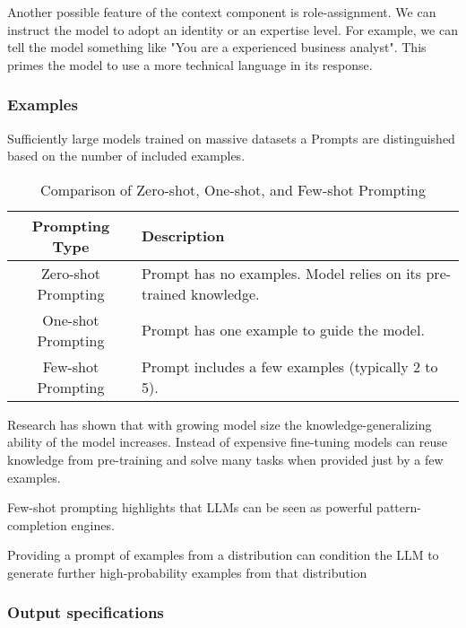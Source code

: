 Another possible feature of the context component is role-assignment. 
We can instruct the model to adopt an identity or an expertise level.
For example, we can tell the model something like "You are a experienced business analyst".
This primes the model to use a more technical language in its response.

\subsubsection{Examples}
Sufficiently large models trained on massive datasets a
Prompts are distinguished based on the number of included examples.

\begin{table}[ht!]
    \centering
    \begin{tabular}{|c|p{8cm}|}
    \hline
    \textbf{Prompting Type} & \textbf{Description} \\
    \hline
    Zero-shot Prompting & Prompt has no examples. Model relies on its pre-trained knowledge. \\
    \hline
    One-shot Prompting & Prompt has one example to guide the model. \\
    \hline
    Few-shot Prompting & Prompt includes a few examples (typically 2 to 5). \\
    \hline
    \end{tabular}
    \caption{Comparison of Zero-shot, One-shot, and Few-shot Prompting}
\end{table}        
Research\cite{brown2020languagemodelsfewshotlearners} has shown that with growing model size the 
knowledge-generalizing ability of the model increases. Instead of expensive fine-tuning
models can reuse knowledge from pre-training and solve many tasks when provided just by a few examples.

Few-shot prompting highlights that LLMs can be seen as powerful pattern-completion engines. \cite{meyerson2024languagemodelcrossovervariation}

Providing a prompt of examples from a distribution can condition the LLM to generate further 
high-probability examples from that distribution \cite{meyerson2024languagemodelcrossovervariation}

\subsubsection{Output specifications}

